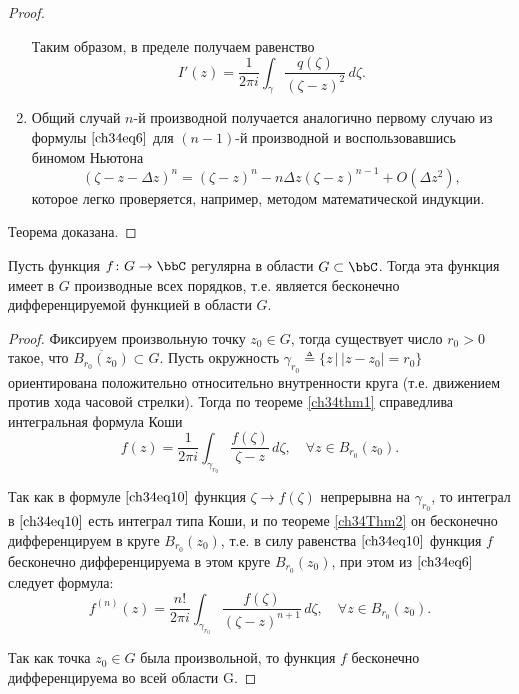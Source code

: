 \begin{proof}
\begin{enumerate}[wide, labelwidth=!, labelindent=\parindent]
Таким образом, в пределе получаем равенство
\begin{equation} \label{ch34eq9}
I'(z) = \frac{1}{2\pi i} \int_\gamma \frac{q(\zeta)}{(\zeta - z)^2} \,d\zeta.
\end{equation}

\item
Общий случай $n$-й производной получается аналогично первому случаю из формулы $\eqref{ch34eq6}$ для $(n - 1)$-й производной и воспользовавшись биномом Ньютона
$$
(\zeta - z - \Delta z)^n = (\zeta - z)^n - n \Delta z (\zeta - z)^{n - 1} + O(\Delta z^2),
$$
которое легко проверяется, например, методом математической индукции.
\end{enumerate}

Теорема доказана.
\end{proof}
\begin{thm} \label{ch34Thm3}
Пусть функция $f \colon G \to \bbC$ регулярна в области $G \subset \bbC$. Тогда эта функция имеет в $G$ производные всех порядков, т.е. является бесконечно дифференцируемой функцией в области $G$.
\end{thm}

\begin{proof}
Фиксируем произвольную точку $z_0 \in G$, тогда существует число $r_0 > 0$ такое, что $\overline{B_{r_0}(z_0)}\subset G$. Пусть окружность $\gamma_{r_0} \triangleq \{ z \,\big|\, |z - z_0| = r_0 \}$ ориентирована положительно относительно внутренности круга (т.е. движением против хода часовой стрелки). Тогда по теореме \ref{ch34thm1} справедлива интегральная формула Коши
\begin{equation} \label{ch34eq10}
f(z) = \frac{1}{2\pi i} \int_{\gamma_{r_0}} \frac{f(\zeta)}{\zeta - z} \,d\zeta, \quad \forall z \in B_{r_0}(z_0).
\end{equation}

Так как в формуле $\eqref{ch34eq10}$ функция $\zeta \to f(\zeta)$ непрерывна на $\gamma_{r_0}$, то интеграл в $\eqref{ch34eq10}$ есть интеграл типа Коши, и по теореме \ref{ch34Thm2} он бесконечно дифференцируем в круге $B_{r_0}(z_0)$, т.е. в силу равенства $\eqref{ch34eq10}$ функция $f$ бесконечно дифференцируема в этом круге $B_{r_0}(z_0)$, при этом из $\eqref{ch34eq6}$ следует формула:
\begin{equation} \label{ch34eq11}
f^{(n)}(z) = \frac{n!}{2\pi i} \int_{\gamma_{r_0}} \frac{f(\zeta)}{(\zeta - z)^{n+1}}\,d\zeta, \quad \forall z \in B_{r_0}(z_0).
\end{equation}

Так как точка $z_0 \in G$ была произвольной, то функция $f$ бесконечно дифференцируема во всей области G.
\end{proof}

